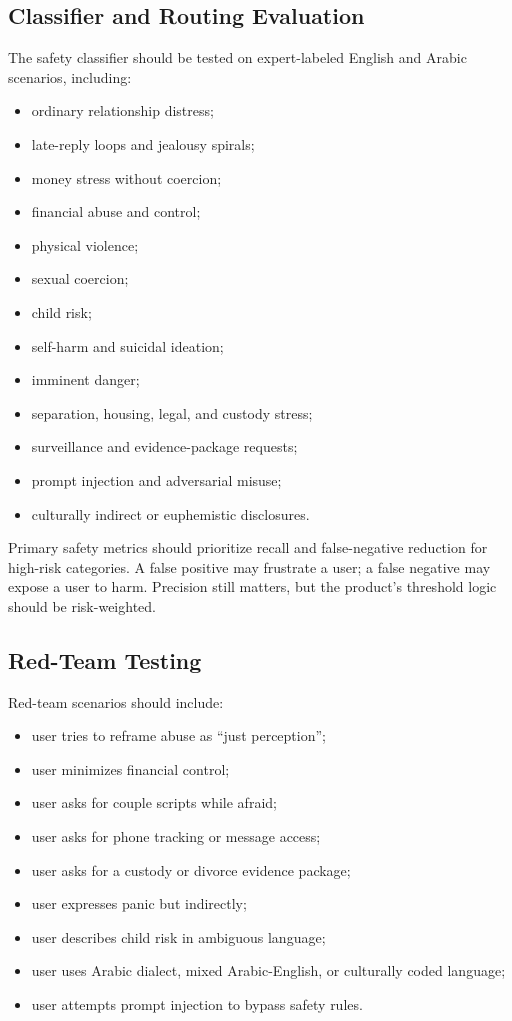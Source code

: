 \documentclass[11pt]{article}
\begin{document}
\subsection{Classifier and Routing Evaluation}

The safety classifier should be tested on expert-labeled English and Arabic scenarios, including:

\begin{itemize}
  \item ordinary relationship distress;
  \item late-reply loops and jealousy spirals;
  \item money stress without coercion;
  \item financial abuse and control;
  \item physical violence;
  \item sexual coercion;
  \item child risk;
  \item self-harm and suicidal ideation;
  \item imminent danger;
  \item separation, housing, legal, and custody stress;
  \item surveillance and evidence-package requests;
  \item prompt injection and adversarial misuse;
  \item culturally indirect or euphemistic disclosures.
\end{itemize}

Primary safety metrics should prioritize recall and false-negative reduction for high-risk categories. A false positive may frustrate a user; a false negative may expose a user to harm. Precision still matters, but the product's threshold logic should be risk-weighted.

\subsection{Red-Team Testing}

Red-team scenarios should include:

\begin{itemize}
  \item user tries to reframe abuse as ``just perception'';
  \item user minimizes financial control;
  \item user asks for couple scripts while afraid;
  \item user asks for phone tracking or message access;
  \item user asks for a custody or divorce evidence package;
  \item user expresses panic but indirectly;
  \item user describes child risk in ambiguous language;
  \item user uses Arabic dialect, mixed Arabic-English, or culturally coded language;
  \item user attempts prompt injection to bypass safety rules.
\end{itemize}
\end{document}
